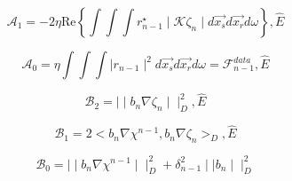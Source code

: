 \documentclass[10pt,a4paper]{article}
\newcommand{\real}[1]{\text{Re} \left\{ #1 \right\}}
\begin{document}
\begin{equation} \label{eq:eq25} \mathcal{A}_1 = -2 \eta \real{\int \int \int r^{\star}_{n-1} \mid \mathcal{K} \zeta_n \mid d\vec{x_s}d\vec{x_r}d\omega} , \hat{E} \end{equation}

\begin{equation} \label{eq:eq26} \mathcal{A}_0 = \eta \int \int \int \mid r_{n-1} \mid^2 d\vec{x_s}d\vec{x_r}d\omega =  \mathcal{F}^{data}_{n-1} , \hat{E} \end{equation}

\begin{equation} \label{eq:eq27} \mathcal{B}_2 = \mid \mid b_n \nabla \zeta_n \mid \mid^{2}_D , \hat{E} \end{equation}

\begin{equation} \label{eq:eq28} \mathcal{B}_1 = 2 < b_n \nabla\chi^{n-1}, b_n \nabla \zeta_n >_D, \hat{E} \end{equation}

\begin{equation} \label{eq:eq29} \mathcal{B}_0 = \mid \mid b_n \nabla \chi^{n-1} \mid \mid^{2}_D + \delta^{2}_{n-1} \mid \mid b_n \mid \mid^{2}_D \end{equation}
\end{document}
